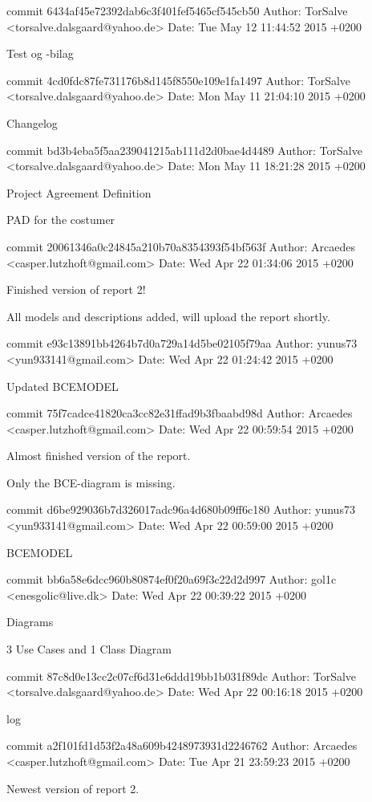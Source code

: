 \documentclass[12pt,a4paper]{article}
\begin{document}
commit 6434af45e72392dab6c3f401fef5465cf545cb50
Author: TorSalve <torsalve.dalsgaard@yahoo.de>
Date:   Tue May 12 11:44:52 2015 +0200

Test og -bilag

commit 4cd0fdc87fe731176b8d145f8550e109e1fa1497
Author: TorSalve <torsalve.dalsgaard@yahoo.de>
Date:   Mon May 11 21:04:10 2015 +0200

Changelog

commit bd3b4eba5f5aa239041215ab111d2d0bae4d4489
Author: TorSalve <torsalve.dalsgaard@yahoo.de>
Date:   Mon May 11 18:21:28 2015 +0200

Project Agreement Definition

PAD for the costumer

commit 20061346a0c24845a210b70a8354393f54bf563f
Author: Arcaedes <casper.lutzhoft@gmail.com>
Date:   Wed Apr 22 01:34:06 2015 +0200

Finished version of report 2!

All models and descriptions added, will upload the report shortly.

commit e93c13891bb4264b7d0a729a14d5be02105f79aa
Author: yunus73 <yun933141@gmail.com>
Date:   Wed Apr 22 01:24:42 2015 +0200

Updated BCEMODEL

commit 75f7cadce41820ca3cc82e31ffad9b3fbaabd98d
Author: Arcaedes <casper.lutzhoft@gmail.com>
Date:   Wed Apr 22 00:59:54 2015 +0200

Almost finished version of the report.

Only the BCE-diagram is missing.

commit d6be929036b7d326017adc96a4d680b09ff6c180
Author: yunus73 <yun933141@gmail.com>
Date:   Wed Apr 22 00:59:00 2015 +0200

BCEMODEL

commit bb6a58e6dcc960b80874ef0f20a69f3c22d2d997
Author: gol1c <enesgolic@live.dk>
Date:   Wed Apr 22 00:39:22 2015 +0200

Diagrams

3 Use Cases and 1 Class Diagram

commit 87c8d0e13cc2c07cf6d31e6ddd19bb1b031f89dc
Author: TorSalve <torsalve.dalsgaard@yahoo.de>
Date:   Wed Apr 22 00:16:18 2015 +0200

log

commit a2f101fd1d53f2a48a609b4248973931d2246762
Author: Arcaedes <casper.lutzhoft@gmail.com>
Date:   Tue Apr 21 23:59:23 2015 +0200

Newest version of report 2.
\end{document}
